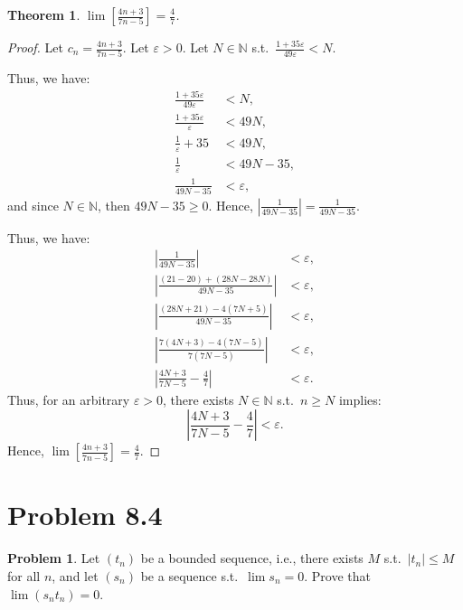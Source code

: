 \documentclass{article}
\newtheorem{theorem}{Theorem}
\theoremstyle{definition}
\newtheorem*{problem}{Problem}
\begin{document}
\begin{theorem}
$\lim\left[\frac{4n+3}{7n-5}\right] = \frac{4}{7}$.
\end{theorem}

\begin{proof}
Let $c_n = \frac{4n+3}{7n-5}$. Let $\varepsilon > 0$. Let $N \in \mathbb{N}$ s.t.\ $\frac{1 + 35\varepsilon}{49\varepsilon} < N$.

Thus, we have:
\begin{align*}
\frac{1 + 35\varepsilon}{49\varepsilon} &< N, \\
\frac{1 + 35\varepsilon}{\varepsilon} &< 49N, \\
\frac{1}{\varepsilon} + 35 &< 49N, \\
\frac{1}{\varepsilon} &< 49N - 35, \\
\frac{1}{49N - 35} &< \varepsilon,
\end{align*}
and since $N \in \mathbb{N}$, then $49N - 35 \geq 0$. Hence, $\left|\frac{1}{49N - 35}\right| = \frac{1}{49N - 35}$.

Thus, we have:
\begin{align*}
\left|\frac{1}{49N - 35}\right| &< \varepsilon, \\
\left|\frac{(21 - 20) + (28N - 28N)}{49N - 35}\right| &< \varepsilon, \\
\left|\frac{(28N + 21) - 4(7N + 5)}{49N - 35}\right| &< \varepsilon, \\
\left|\frac{7(4N + 3) - 4(7N - 5)}{7(7N - 5)}\right| &< \varepsilon, \\
\left|\frac{4N + 3}{7N - 5} - \frac{4}{7}\right| &< \varepsilon.
\end{align*}
Thus, for an arbitrary $\varepsilon > 0$, there exists $N \in \mathbb{N}$ s.t.\ $n \geq N$ implies:
\[
\left|\frac{4N + 3}{7N - 5} - \frac{4}{7}\right| < \varepsilon.
\]
Hence, $\lim\left[\frac{4n+3}{7n-5}\right] = \frac{4}{7}$.
\end{proof}

\clearpage
\section{Problem 8.4}

\begin{problem}
Let $(t_n)$ be a bounded sequence, i.e., there exists $M$ s.t.\ $|t_n| \leq M$ for all $n$, and let $(s_n)$ be a sequence s.t.\ $\lim s_n = 0$. Prove that $\lim(s_n t_n) = 0$.
\end{problem}
\end{document}
